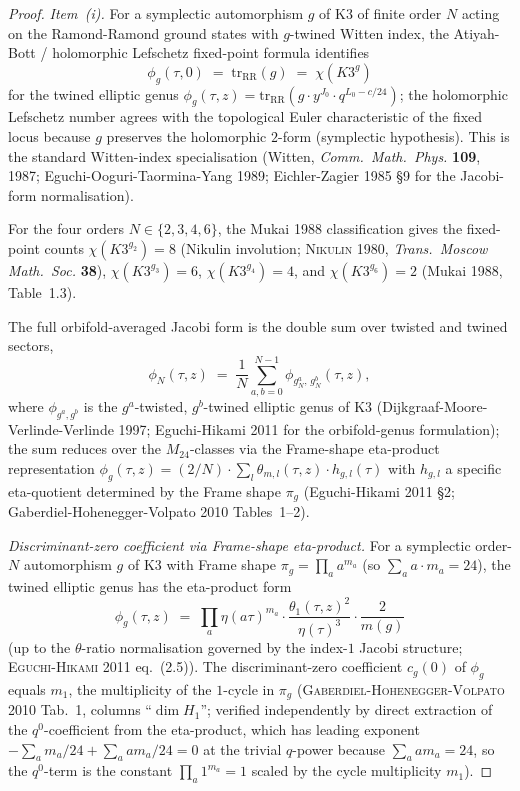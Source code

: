 \begin{proof}
\textit{Item~(i).}
For a symplectic automorphism $g$ of K3 of finite order $N$ acting on
the Ramond-Ramond ground states with $g$-twined Witten index, the
Atiyah-Bott / holomorphic Lefschetz fixed-point formula identifies
\[
 \phi_g(\tau, 0) \;=\; \mathrm{tr}_{\mathrm{RR}}(g) \;=\; \chi(K3^g)
\]
for the twined elliptic genus
$\phi_g(\tau, z) = \mathrm{tr}_{\mathrm{RR}}(g \cdot y^{J_0} \cdot q^{L_0 - c/24})$;
the holomorphic Lefschetz number agrees with the topological Euler
characteristic of the fixed locus because $g$ preserves the holomorphic
$2$-form (symplectic hypothesis). This is the standard Witten-index
specialisation \textup{(Witten, \emph{Comm.~Math.~Phys.} \textbf{109},
1987; Eguchi-Ooguri-Taormina-Yang 1989; Eichler-Zagier 1985 §9 for the
Jacobi-form normalisation)}.

For the four orders $N \in \{2, 3, 4, 6\}$, the Mukai 1988 classification
gives the fixed-point counts
$\chi(K3^{g_2}) = 8$ (Nikulin involution; \textsc{Nikulin} 1980,
\textit{Trans.~Moscow Math.~Soc.} \textbf{38}),
$\chi(K3^{g_3}) = 6$, $\chi(K3^{g_4}) = 4$, and $\chi(K3^{g_6}) = 2$
\textup{(Mukai 1988, Table~1.3)}.

The full orbifold-averaged Jacobi form is the double sum over twisted
and twined sectors,
\[
 \phi_N(\tau, z) \;=\; \frac{1}{N} \sum_{a, b = 0}^{N-1} \phi_{g_N^a,\, g_N^b}(\tau, z),
\]
where $\phi_{g^a, g^b}$ is the $g^a$-twisted, $g^b$-twined elliptic
genus of K3 \textup{(Dijkgraaf-Moore-Verlinde-Verlinde 1997; Eguchi-Hikami
2011 for the orbifold-genus formulation)}; the sum reduces over the
$M_{24}$-classes via the Frame-shape eta-product representation
$\phi_g(\tau, z) = (2/N) \cdot \sum_l \theta_{m, l}(\tau, z) \cdot h_{g, l}(\tau)$
with $h_{g, l}$ a specific eta-quotient determined by the Frame shape
$\pi_g$ \textup{(Eguchi-Hikami 2011 §2; Gaberdiel-Hohenegger-Volpato 2010
Tables~1--2)}.

\textit{Discriminant-zero coefficient via Frame-shape eta-product.}
For a symplectic order-$N$ automorphism $g$ of K3 with Frame shape
$\pi_g = \prod_a a^{m_a}$ (so $\sum_a a \cdot m_a = 24$), the twined
elliptic genus has the eta-product form
\[
 \phi_g(\tau, z) \;=\; \prod_a \eta(a \tau)^{m_a}
 \cdot \frac{\theta_1(\tau, z)^2}{\eta(\tau)^3} \cdot \frac{2}{m(g)}
\]
\textup{(}up to the $\theta$-ratio normalisation governed by the index-$1$
Jacobi structure; \textsc{Eguchi-Hikami 2011} eq.~(2.5)\textup{)}.
The discriminant-zero coefficient $c_g(0)$ of $\phi_g$ equals
$m_1$, the multiplicity of the $1$-cycle in $\pi_g$
\textup{(}\textsc{Gaberdiel-Hohenegger-Volpato 2010} Tab.~1, columns
``$\dim H_1$''; verified independently by direct extraction of the
$q^0$-coefficient from the eta-product, which has leading exponent
$-\sum_a m_a / 24 + \sum_a a m_a / 24 = 0$ at the trivial $q$-power
because $\sum_a a m_a = 24$, so the $q^0$-term is the constant
$\prod_a 1^{m_a} = 1$ scaled by the cycle multiplicity $m_1$\textup{)}.


\end{proof}
